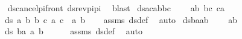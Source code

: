 \begin{isabellebody}
%
\isadelimproof
\ \ %
\endisadelimproof
%
\isatagproof
{}\isamarkupfalse%
\ ds{\isacharunderscore}{\kern0pt}cancel{\isacharunderscore}{\kern0pt}pi{\isacharunderscore}{\kern0pt}front\ ds{\isacharunderscore}{\kern0pt}rev{\isacharunderscore}{\kern0pt}pi{\isacharunderscore}{\kern0pt}pi\ \isamarkupfalse%
\ blast%
\endisatagproof
{\isafoldproof}%
%
\isadelimproof
\isanewline
%
\endisadelimproof
\isanewline
{}\isamarkupfalse%
\ ds{\isacharunderscore}{\kern0pt}acabbc{\isacharcolon}{\kern0pt}\ \isanewline
\ \ \ {\isachardoublequoteopen}a{\isasymnoteq}b{\isachardoublequoteclose}\ {\isachardoublequoteopen}b{\isasymnoteq}c{\isachardoublequoteclose}\ {\isachardoublequoteopen}c{\isasymnoteq}a{\isachardoublequoteclose}\isanewline
\ \ \ {\isachardoublequoteopen}ds\ {\isacharbrackleft}{\kern0pt}{\isacharparenleft}{\kern0pt}a{\isacharcomma}{\kern0pt}\ b{\isacharparenright}{\kern0pt}{\isacharcomma}{\kern0pt}\ {\isacharparenleft}{\kern0pt}b{\isacharcomma}{\kern0pt}\ c{\isacharparenright}{\kern0pt}{\isacharbrackright}{\kern0pt}\ {\isacharbrackleft}{\kern0pt}{\isacharparenleft}{\kern0pt}a{\isacharcomma}{\kern0pt}\ c{\isacharparenright}{\kern0pt}{\isacharbrackright}{\kern0pt}\ {\isacharequal}{\kern0pt}\ {\isacharbraceleft}{\kern0pt}a{\isacharcomma}{\kern0pt}\ b{\isacharbraceright}{\kern0pt}{\isachardoublequoteclose}\isanewline
%
\isadelimproof
\ \ %
\endisadelimproof
%
\isatagproof
{}\isamarkupfalse%
\ assms\ ds{\isacharunderscore}{\kern0pt}def\ \isamarkupfalse%
\ auto%
\endisatagproof
{\isafoldproof}%
%
\isadelimproof
\isanewline
%
\endisadelimproof
\isanewline
{}\isamarkupfalse%
\ ds{\isacharunderscore}{\kern0pt}baab{\isacharcolon}{\kern0pt}\ \isanewline
\ \ \ {\isachardoublequoteopen}a{\isasymnoteq}b{\isachardoublequoteclose}\isanewline
\ \ \ {\isachardoublequoteopen}ds\ {\isacharbrackleft}{\kern0pt}{\isacharparenleft}{\kern0pt}b{\isacharcomma}{\kern0pt}a{\isacharparenright}{\kern0pt}{\isacharbrackright}{\kern0pt}\ {\isacharbrackleft}{\kern0pt}{\isacharparenleft}{\kern0pt}a{\isacharcomma}{\kern0pt}\ b{\isacharparenright}{\kern0pt}{\isacharbrackright}{\kern0pt}\ {\isacharequal}{\kern0pt}\ {\isacharbraceleft}{\kern0pt}{\isacharbraceright}{\kern0pt}{\isachardoublequoteclose}\isanewline
%
\isadelimproof
\ \ %
\endisadelimproof
%
\isatagproof
{}\isamarkupfalse%
\ assms\ ds{\isacharunderscore}{\kern0pt}def\ \isamarkupfalse%
\ auto%
\endisatagproof

\end{isabellebody}
